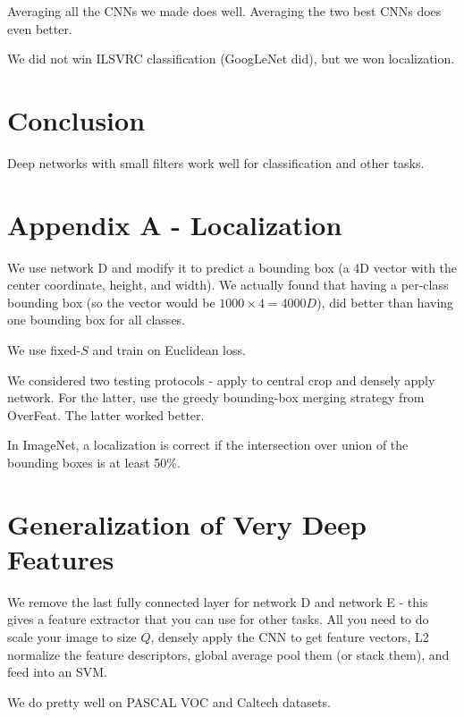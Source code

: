 \documentclass[a4paper]{article}
\begin{document}
Averaging all the CNNs we made does well. Averaging the two best CNNs does even
better.

We did not win ILSVRC classification (GoogLeNet did), but we won localization.

\section{Conclusion}
Deep networks with small filters work well for classification and other tasks.

\section{Appendix A - Localization}
We use network D and modify it to predict a bounding box (a 4D vector with the
center coordinate, height, and width). We actually found that having a
per-class bounding box (so the vector would be $1000 \times 4 = 4000D$), did
better than having one bounding box for all classes.

We use fixed-$S$ and train on Euclidean loss.

We considered two testing protocols - apply to central crop and densely apply
network. For the latter, use the greedy bounding-box merging strategy from
OverFeat. The latter worked better.

In ImageNet, a localization is correct if the intersection over union of the
bounding boxes is at least 50\%.

\section{Generalization of Very Deep Features}
We remove the last fully connected layer for network D and network E - this
gives a feature extractor that you can use for other tasks. All you need to
do scale your image to size $Q$, densely apply the CNN to get feature vectors,
L2 normalize the feature descriptors, global average pool them (or stack them),
and feed into an SVM.

We do pretty well on PASCAL VOC and Caltech datasets.
\end{document}
